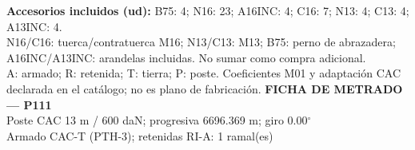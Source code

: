 \begingroup\scriptsize
\textbf{Accesorios incluidos (ud):} B75: 4; N16: 23; A16INC: 4; C16: 7; N13: 4; C13: 4; A13INC: 4.\\
N16/C16: tuerca/contratuerca M16; N13/C13: M13; B75: perno de abrazadera; A16INC/A13INC: arandelas incluidas. No sumar como compra adicional.\\
A: armado; R: retenida; T: tierra; P: poste. Coeficientes M01 y adaptación CAC declarada en el catálogo; no es plano de fabricación.
\endgroup\endgroup
\clearpage{}
\begingroup\small\setlength{\parskip}{3pt}\renewcommand{\arraystretch}{1.05}
\textbf{\large FICHA DE METRADO — P111}\\[4pt]
Poste CAC 13 m / 600 daN; progresiva 6696.369 m; giro 0.00\ensuremath{^\circ}\\
Armado CAC-T (PTH-3); retenidas RI-A: 1 ramal(es)\\
\begingroup\scriptsize
